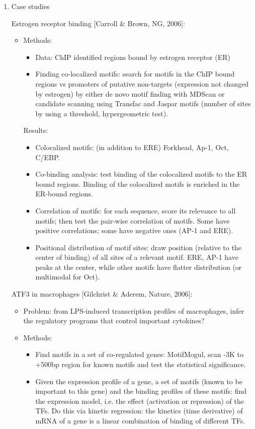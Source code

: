 \documentclass{report}
\begin{document}
\begin{enumerate}
	\item{Case studies}
	
	Estrogen receptor binding [Carroll \& Brown, NG, 2006]:
	\begin{itemize}
		\item Methods: 
		\begin{itemize}
			\item Data: ChIP identified regions bound by estrogen receptor (ER)
			\item Finding co-localized motifs: search for motifs in the ChIP bound regions vs promoters of putative non-targets (expression not changed by estrogen) by either de novo motif finding with MDScan or candidate scanning using Transfac and Jaspar motifs (number of sites by using a threshold, hypergeometric test). 
		\end{itemize}
		
		Results: 
		\begin{itemize}
			\item Colocalized motifs: (in addition to ERE) Forkhead, Ap-1, Oct, C/EBP. 
			\item Co-binding analysis: test binding of the colocalized motifs to the ER bound regions. Binding of the colocalized motifs is enriched in the ER-bound regions. 
			\item Correlation of motifs: for each sequence, score its relevance to all motifs; then test the pair-wise correlation of motifs. Some have positive correlations; some have negative ones (AP-1 and ERE). 
			\item Positional distribution of motif sites: draw position (relative to the center of binding) of all sites of a relevant motif. ERE, AP-1 have peaks at the center, while other motifs have flatter distribution (or multimodal for Oct). 
		\end{itemize}
	\end{itemize}
	
	ATF3 in macrophages [Gilchrist \& Aderem, Nature, 2006]:
	\begin{itemize}
		\item Problem: from LPS-induced transcription profiles of macrophages, infer the regulatory programs that control important cytokines? 
		
		\item Methods:
		\begin{itemize}
			\item Find motifs in a set of co-regulated genes: MotifMogul, scan -3K to +500bp region for known motifs and test the statistical significance. 
			\item Given the expression profile of a gene, a set of motifs (known to be important to this gene) and the binding profiles of these motifs: find the expression model, i.e. the effect (activation or repression) of the TFs. Do this via kinetic regression: the kinetics (time derivative) of mRNA of a gene is a linear combination of binding of different TFs. 
		\end{itemize}
		

\end{itemize}
\end{enumerate}
\end{document}

